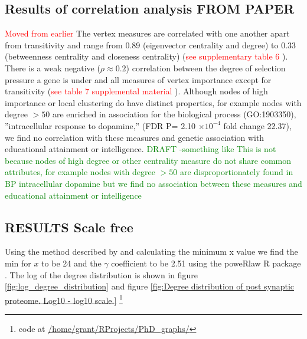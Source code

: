 \subsection{Results of correlation analysis FROM PAPER}
\textcolor{red}{Moved from earlier}
The vertex measures are correlated with one another apart from transitivity and range from 0.89 (eigenvector centrality and degree) to 0.33 (betweenness centrality and closeness centrality) (\textcolor{red}{see supplementary table 6} ).
There is a weak negative ($\rho \approx 0.2$) correlation between 
the degree of selection pressure a gene is under and all measures of vertex importance except for transitivity (\textcolor{red}{see table 7 supplemental material} ).
Although nodes of high importance or local clustering do have distinct properties, for example nodes with degree $> 50$ are enriched in association for the biological process (GO:1903350)‚ ”intracellular response to dopamine‚” (FDR P= 2.10 $\times 10^{-4}$ fold change 22.37), we find no correlation with these measures and genetic association with educational attainment or intelligence. 
\textcolor{green}{DRAFT -something like This is not because nodes of high degree or other centrality measure do not share common attributes, for example nodes with degree $>50$ are disproportionately found in BP intracellular dopamine but we find no association between these measures and educational attainment or intelligence}



\subsection{RESULTS Scale free}
Using the method described by \cite{clauset2009power} and calculating the minimum x value we find the min for $x$ to be 24 and the $\gamma$ coefficient to be 2.51 using the poweRlaw R package \cite{gillespie2015fitting}. The log of the degree distribution is shown in figure \ref{fig:log_degree_distribution} and figure \ref{fig:Degree distribution of post synaptic proteome. Log10 - log10 scale.}
\footnote{code at \url{/home/grant/RProjects/PhD_graphs/}}


